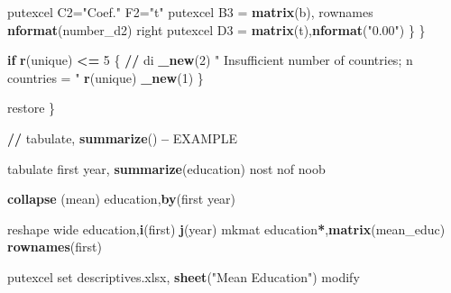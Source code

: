 \documentclass[
  12pt,
]{article}
\newenvironment{Shaded}{\begin{snugshade}}{\end{snugshade}}
\newcommand{\ControlFlowTok}[1]{\textcolor[rgb]{0.13,0.29,0.53}{\textbf{#1}}}
\newcommand{\DecValTok}[1]{\textcolor[rgb]{0.00,0.00,0.81}{#1}}
\newcommand{\ErrorTok}[1]{\textcolor[rgb]{0.64,0.00,0.00}{\textbf{#1}}}
\newcommand{\KeywordTok}[1]{\textcolor[rgb]{0.13,0.29,0.53}{\textbf{#1}}}
\newcommand{\NormalTok}[1]{#1}
\newcommand{\OperatorTok}[1]{\textcolor[rgb]{0.81,0.36,0.00}{\textbf{#1}}}
\newcommand{\StringTok}[1]{\textcolor[rgb]{0.31,0.60,0.02}{#1}}
\begin{document}
\begin{Shaded}
\begin{Highlighting}[]
{\NormalTok{                        putexcel C2=}\StringTok{"Coef."}\NormalTok{ F2=}\StringTok{"t"}
\NormalTok{                        putexcel B3 =}\StringTok{ }\KeywordTok{matrix}\NormalTok{(b), rownames }\KeywordTok{nformat}\NormalTok{(number_d2) right}
\NormalTok{                        putexcel D3 =}\StringTok{ }\KeywordTok{matrix}\NormalTok{(t),}\KeywordTok{nformat}\NormalTok{(}\StringTok{"0.00"}\NormalTok{)}
\NormalTok{                \}}
\NormalTok{            \}}
            
            \ControlFlowTok{if} \KeywordTok{r}\NormalTok{(unique) }\OperatorTok{<=}\StringTok{ }\DecValTok{5}\NormalTok{ \{}
                \OperatorTok{/}\ErrorTok{/}\StringTok{ }\NormalTok{di }\KeywordTok{_new}\NormalTok{(}\DecValTok{2}\NormalTok{) }\StringTok{" Insufficient number of countries; n countries = "} \KeywordTok{r}\NormalTok{(unique) }\KeywordTok{_new}\NormalTok{(}\DecValTok{1}\NormalTok{)}
\NormalTok{            \}}
            
\NormalTok{        restore}
\NormalTok{\}}

\OperatorTok{/}\ErrorTok{/}\StringTok{ }\NormalTok{tabulate, }\KeywordTok{summarize}\NormalTok{() }\OperatorTok{--}\StringTok{ }\NormalTok{EXAMPLE}

\NormalTok{tabulate first year, }\KeywordTok{summarize}\NormalTok{(education) nost nof noob}

\KeywordTok{collapse}\NormalTok{ (mean) education,}\KeywordTok{by}\NormalTok{(first year)}

\NormalTok{reshape wide education,}\KeywordTok{i}\NormalTok{(first) }\KeywordTok{j}\NormalTok{(year)}
\NormalTok{mkmat education}\OperatorTok{*}\NormalTok{,}\KeywordTok{matrix}\NormalTok{(mean_educ) }\KeywordTok{rownames}\NormalTok{(first)}

\NormalTok{putexcel set descriptives.xlsx, }\KeywordTok{sheet}\NormalTok{(}\StringTok{"Mean Education"}\NormalTok{) modify}

}
\end{Highlighting}
\end{Shaded}
\end{document}

